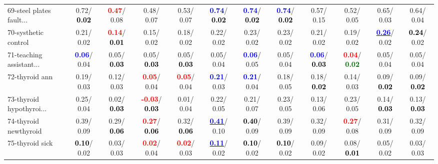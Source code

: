 \begin{table}[h]
\begin{center}
{\begin{tabular}{lc|c|c|c|c|c|c|c|c|c|c}
69-steel plates fault... &   0.72/\textcolor{black}{\textbf{  0.02}} & \textcolor{red}{\textbf{  0.47}}/  0.08 &   0.48/  0.07 &   0.53/  0.07 & \textcolor{blue}{\textbf{  0.74}}/\textcolor{black}{\textbf{  0.02}} & \textcolor{blue}{\textbf{  0.74}}/\textcolor{black}{\textbf{  0.02}} & \textcolor{blue}{\textbf{  0.74}}/\textcolor{black}{\textbf{  0.02}} &   0.57/  0.15 &   0.52/  0.05 &   0.65/  0.03 &   0.64/  0.04 \\
70-systhetic control &   0.21/  0.02 & \textcolor{red}{\textbf{  0.14}}/\textcolor{black}{\textbf{  0.01}} &   0.15/  0.02 &   0.18/  0.02 &   0.22/  0.02 &   0.23/  0.02 &   0.23/  0.02 &   0.21/  0.02 &   0.19/  0.02 & \underline{\textcolor{blue}{\textbf{  0.26}}}/  0.02 & \textcolor{black}{\textbf{  0.24}}/  0.02 \\
71-teaching assistant... & \textcolor{blue}{\textbf{  0.06}}/  0.04 &   0.05/\textcolor{black}{\textbf{  0.03}} &   0.05/\textcolor{black}{\textbf{  0.03}} &   0.05/\textcolor{black}{\textbf{  0.03}} &   0.05/  0.04 & \textcolor{blue}{\textbf{  0.06}}/  0.05 &   0.05/  0.04 & \textcolor{blue}{\textbf{  0.06}}/\textcolor{black}{\textbf{  0.03}} & \textcolor{red}{\textbf{  0.04}}/\textcolor{darkgreen}{\textbf{  0.02}} &   0.05/  0.04 &   0.05/  0.04 \\ \hline
72-thyroid ann &   0.19/  0.03 &   0.12/  0.03 & \textcolor{red}{\textbf{  0.05}}/  0.04 & \textcolor{red}{\textbf{  0.05}}/  0.04 & \textcolor{blue}{\textbf{  0.21}}/  0.03 & \textcolor{blue}{\textbf{  0.21}}/  0.04 &   0.18/  0.05 &   0.18/\textcolor{black}{\textbf{  0.02}} &   0.14/  0.03 &   0.09/\textcolor{black}{\textbf{  0.02}} &   0.09/\textcolor{black}{\textbf{  0.02}} \\
73-thyroid hypothyroi... &   0.25/  0.04 &   0.02/\textcolor{black}{\textbf{  0.03}} & \textcolor{red}{\textbf{ -0.03}}/\textcolor{black}{\textbf{  0.03}} &   0.01/  0.04 &   0.22/  0.05 &   0.21/  0.07 &   0.23/  0.05 &   0.13/  0.06 &   0.23/  0.05 &   0.14/\textcolor{black}{\textbf{  0.03}} &   0.13/\textcolor{black}{\textbf{  0.03}} \\
74-thyroid newthyroid &   0.39/  0.09 &   0.29/\textcolor{black}{\textbf{  0.06}} & \textcolor{red}{\textbf{  0.27}}/\textcolor{black}{\textbf{  0.06}} &   0.32/\textcolor{black}{\textbf{  0.06}} & \underline{\textcolor{blue}{\textbf{  0.41}}}/  0.10 & \textcolor{black}{\textbf{  0.40}}/  0.09 &   0.39/  0.09 &   0.32/  0.09 & \textcolor{red}{\textbf{  0.27}}/  0.08 &   0.31/  0.09 &   0.32/  0.09 \\
75-thyroid sick & \textcolor{black}{\textbf{  0.10}}/  0.02 &   0.03/  0.03 & \textcolor{red}{\textbf{  0.02}}/  0.04 & \textcolor{red}{\textbf{  0.02}}/  0.03 & \underline{\textcolor{blue}{\textbf{  0.11}}}/  0.02 & \textcolor{black}{\textbf{  0.10}}/  0.02 & \textcolor{black}{\textbf{  0.10}}/  0.02 &   0.09/  0.02 &   0.08/\textcolor{black}{\textbf{  0.01}} &   0.05/  0.02 &   0.03/  0.03 \\

\end{tabular}}
\end{center}
\end{table}
